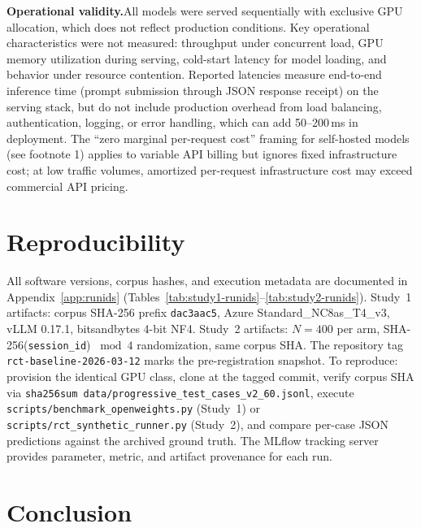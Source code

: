 \documentclass{article}
\begin{document}
\textbf{Operational validity.}\quad All models were served sequentially with exclusive GPU allocation, which does not reflect production conditions. Key operational characteristics were not measured: throughput under concurrent load, GPU memory utilization during serving, cold-start latency for model loading, and behavior under resource contention. Reported latencies measure end-to-end inference time (prompt submission through JSON response receipt) on the serving stack, but do not include production overhead from load balancing, authentication, logging, or error handling, which can add 50--200\,ms in deployment. The ``zero marginal per-request cost'' framing for self-hosted models (see footnote 1) applies to variable API billing but ignores fixed infrastructure cost; at low traffic volumes, amortized per-request infrastructure cost may exceed commercial API pricing.

\section{Reproducibility}
\label{sec:repro}

All software versions, corpus hashes, and execution metadata are documented in Appendix~\ref{app:runids} (Tables~\ref{tab:study1-runids}--\ref{tab:study2-runids}). Study~1 artifacts: corpus SHA-256 prefix \texttt{dac3aac5}, Azure Standard\_NC8as\_T4\_v3, vLLM 0.17.1, bitsandbytes 4-bit NF4. Study~2 artifacts: $N = 400$ per arm, SHA-256(\texttt{session\_id}) $\bmod 4$ randomization, same corpus SHA. The repository tag \texttt{rct-baseline-2026-03-12} marks the pre-registration snapshot. To reproduce: provision the identical GPU class, clone at the tagged commit, verify corpus SHA via \texttt{sha256sum data/progressive\_test\_cases\_v2\_60.jsonl}, execute \texttt{scripts/benchmark\_openweights.py} (Study~1) or \texttt{scripts/rct\_synthetic\_runner.py} (Study~2), and compare per-case JSON predictions against the archived ground truth. The MLflow tracking server \citep{zaharia2018mlflow} provides parameter, metric, and artifact provenance for each run.

\section{Conclusion}
\label{sec:conclusion}
\end{document}
